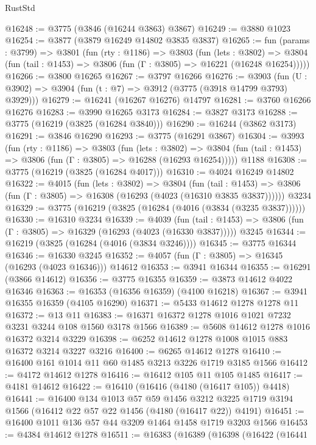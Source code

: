 \begin{lexlean}{RustStd}
\begin{coremodule}
@16248 := @3775 (@3846 (@16244 @3863) @3867)
@16249 := @3880 @1023
@16254 := @3877 (@3879 @16249 @14802 @3835 @3837)
@16265 := fun (params : @3799) =>
  @3801
    (fun (rty : @1186) =>
    @3803
      (fun (lets : @3802) =>
      @3804 (fun (tail : @1453) => @3806 (fun (Γ : @3805) => @16221 (@16248 @16254)))))
@16266 := @3800 @16265
@16267 := @3797 @16266
@16276 := @3903
    (fun (U : @3902) => @3904 (fun (t : @7) => @3912 (@3775 (@3918 @14799 @3793) @3929)))
@16279 := @16241 (@16267 @16276) @14797
@16281 := @3760 @16266 @16276
@16283 := @3990 @16265 @3173
@16284 := @3827 @3173
@16288 := @3775 (@16219 (@3825 (@16284 @3840)))
@16290 := @16244 (@3862 @3173)
@16291 := @3846 @16290
@16293 := @3775 (@16291 @3867)
@16304 := @3993
    (fun (rty : @1186) =>
    @3803
      (fun (lets : @3802) =>
      @3804 (fun (tail : @1453) => @3806 (fun (Γ : @3805) => @16288 (@16293 @16254)))))
    @1188
@16308 := @3775 (@16219 (@3825 (@16284 @4017)))
@16310 := @4024 @16249 @14802
@16322 := @4015
    (fun (lets : @3802) =>
    @3804
      (fun (tail : @1453) =>
      @3806 (fun (Γ : @3805) => @16308 (@16293 (@4023 (@16310 @3835 @3837))))))
    @3234
@16329 := @3775 (@16219 (@3825 (@16284 (@4016 (@3834 (@3235 @3837))))))
@16330 := @16310 @3234
@16339 := @4039
    (fun (tail : @1453) => @3806 (fun (Γ : @3805) => @16329 (@16293 (@4023 (@16330 @3837)))))
    @3245
@16344 := @16219 (@3825 (@16284 (@4016 (@3834 @3246))))
@16345 := @3775 @16344
@16346 := @16330 @3245
@16352 := @4057 (fun (Γ : @3805) => @16345 (@16293 (@4023 @16346))) @14612
@16353 := @3941 @16344
@16355 := @16291 (@3866 @14612)
@16356 := @3775 @16355
@16359 := @3873 @14612 @4022 @16346
@16363 := @16353 (@16356 @16359) (@4100 @16218)
@16367 := @3941 @16355 @16359 (@4105 @16290)
@16371 := @5433 @14612 @1278 @1278 @11
@16372 := @13 @11
@16383 := @16371 @16372 @1278 @1016 @1021 @7232 @3231 @3244 @108 @1560 @3178 @1566
@16389 := @5608 @14612 @1278 @1016 @16372 @3214 @3229
@16398 := @6252 @14612 @1278 @1008 @1015 @883 @16372 @3214 @3227 @3216
@16400 := @6265 @14612 @1278
@16410 := @16400 @161 @1014 @11 @60 @1485 @3213 @3226 @1719 @3185 @1566
@16412 := @4172 @14612 @1278
@16416 := @16412 @105 @11 @105 @1485
@16417 := @4181 @14612
@16422 := @16410 (@16416 (@4180 (@16417 @105)) @4418)
@16441 := @16400
    @134
    @1013
    @57
    @59
    @1456
    @3212
    @3225
    @1719
    @3194
    @1566
    (@16412 @22 @57 @22 @1456 (@4180 (@16417 @22)) @4191)
@16451 := @16400 @1011 @136 @57 @44 @3209 @1464 @1458 @1719 @3203 @1566
@16453 := @4384 @14612 @1278
@16511 := @16383
    (@16389
      (@16398
        (@16422
          (@16441

\end{coremodule}
\end{lexlean}
